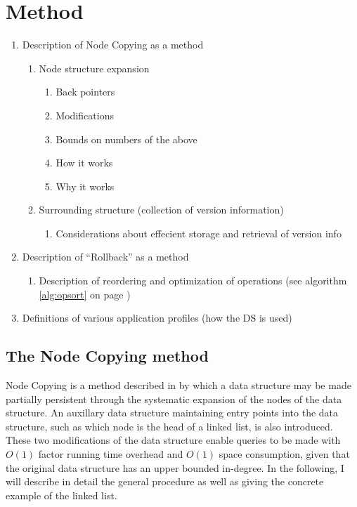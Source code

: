 \chapter{Method}

\begin{enumerate}
  \item Description of Node Copying as a method
  \begin{enumerate}
    \item Node structure expansion
    \begin{enumerate}
      \item Back pointers
      \item Modifications
      \item Bounds on numbers of the above
      \item How it works
      \item Why it works
    \end{enumerate}
    \item Surrounding structure (collection of version information)
    \begin{enumerate}
      \item Considerations about effecient storage and retrieval of version info
    \end{enumerate}
  \end{enumerate}
  \item Description of ``Rollback'' as a method
  \begin{enumerate}
    \item Description of reordering and optimization of operations (see algorithm \ref{alg:opsort} on page \pageref{alg:opsort})
  \end{enumerate}
  \item Definitions of various application profiles (how the DS is used)
\end{enumerate}

\section{The Node Copying method}
Node Copying is a method described in \cite{Driscoll198986} by which a data
structure may be made partially persistent through the systematic expansion of
the nodes of the data structure. An auxillary data structure maintaining entry
points into the data structure, such as which node is the head of a linked list,
is also introduced. These two modifications of the data structure enable queries
to be made with $O(1)$ factor running time overhead and $O(1)$ space
consumption, given that the original data structure has an upper bounded
in-degree. In the following, I will describe in detail the general procedure as
well as giving the concrete example of the linked list.

